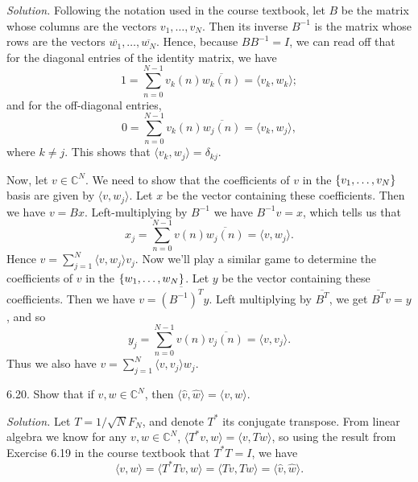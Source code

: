 \documentclass{article}
\newcommand{\C}{\mathbb{C}}
\begin{document}
\textit{Solution.}
Following the notation used in the course textbook, let $B$ be the
matrix whose columns are the vectors $v_1, \ldots, v_N$. Then its
inverse $B^{-1}$ is the matrix whose rows are the vectors
$\overline{w_1}, \ldots, \overline{w_N}$. Hence, because $B B^{-1} = I$,
we can read off that for the diagonal entries of the identity matrix, we
have
%
\begin{equation*}
    1 = \sum_{n = 0}^{N - 1} v_k(n) \overline{w_k(n)} = \langle v_k, w_k \rangle
    ;
\end{equation*}
%
and for the off-diagonal entries,
%
\begin{equation*}
    0 = \sum_{n = 0}^{N - 1} v_k(n) \overline{w_j(n)} = \langle v_k, w_j \rangle
    ,
\end{equation*}
%
where $k \neq j$. This shows that $\langle v_k, w_j \rangle = \delta_{k j}$.

Now, let $v \in \C^N$. We need to show that the coefficients of $v$ in
the $\cbr{v_1, \ldots, v_N}$ basis are given by $\langle v, w_j
\rangle$. Let $x$ be the vector containing these coefficients. Then we
have $v = B x$. Left-multiplying by $B^{-1}$ we have $B^{-1} v = x$,
which tells us that
%
\begin{equation*}
    x_j = \sum_{n = 0}^{N - 1} v(n) \overline{w_j(n)} = \langle v, w_j \rangle
    .
\end{equation*}
%
Hence $v = \sum_{j = 1}^N \langle v, w_j \rangle v_j$. Now we'll play a
similar game to determine the coefficients of $v$ in the
$\cbr{w_1, \ldots, w_N}$. Let $y$ be the vector containing these coefficients.
Then we have $v = \overline{(B^{-1})^T} y$. Left multiplying by $\overline{B^T}$,
we get $\overline{B^T} v = y$, and so
%
\begin{equation*}
    y_j = \sum_{n = 0}^{N - 1} v(n) \overline{v_j(n)} = \langle v, v_j \rangle
    .
\end{equation*}
%
Thus we also have $v = \sum_{j = 1}^N \langle v, v_j \rangle w_j$.

\newpage

6.20. Show that if $v, w \in \C^N$, then
$\langle \widehat{v}, \widehat{w} \rangle = \langle v, w \rangle$.

\textit{Solution.}
Let $T = 1 / \sqrt{N} F_N$, and denote $T^*$ its conjugate transpose.
From linear algebra we know for any $v, w \in \C^N$,
$\langle T^* v, w \rangle = \langle v, T w \rangle$, so
using the result from Exercise 6.19 in the course textbook that
$T^* T = I$, we have
%
\begin{equation*}
    \langle v, w \rangle
    = \langle T^* T v, w \rangle
    = \langle T v, T w \rangle
    = \langle \widehat{v}, \widehat{w} \rangle
    .
\end{equation*}
\end{document}

